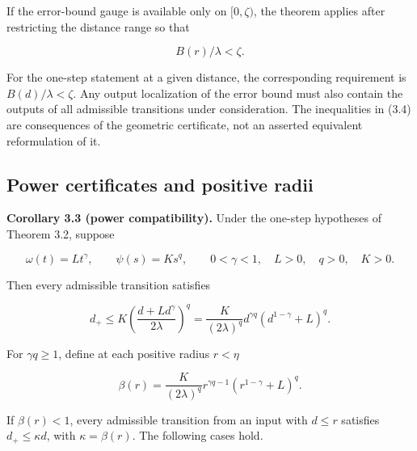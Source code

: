 \documentclass[11pt,a4paper]{article}
\theoremstyle{plain}
\theoremstyle{definition}
\theoremstyle{remark}
\begin{document}
If the error-bound gauge is available only on \([0,\zeta)\), the theorem
applies after restricting the distance range so that

\[
B(r)/\lambda<\zeta.
\tag{3.14}
\]

For the one-step statement at a given distance, the corresponding
requirement is \(B(d)/\lambda<\zeta\). Any output localization of the
error bound must also contain the outputs of all admissible transitions
under consideration. The inequalities in (3.4) are consequences of the
geometric certificate, not an asserted equivalent reformulation of it.

\hypertarget{power-certificates-and-positive-radii}{%
\subsection{Power certificates and positive
radii}\label{power-certificates-and-positive-radii}}

\textbf{Corollary 3.3 (power compatibility).} Under the one-step
hypotheses of Theorem 3.2, suppose

\[
\omega(t)=Lt^\gamma,
\qquad
\psi(s)=Ks^q,
\qquad
0<\gamma<1,\quad L>0,\quad q>0,\quad K>0.
\tag{3.15}
\]

Then every admissible transition satisfies

\[
d_+
\le K\left(\frac{d+Ld^\gamma}{2\lambda}\right)^q
=\frac{K}{(2\lambda)^q}
d^{\gamma q}(d^{1-\gamma}+L)^q.
\tag{3.16}
\]

For \(\gamma q\ge1\), define at each positive radius \(r<\eta\)

\[
\beta(r)=\frac{K}{(2\lambda)^q}
r^{\gamma q-1}(r^{1-\gamma}+L)^q.
\tag{3.17}
\]

If \(\beta(r)<1\), every admissible transition from an input with
\(d\le r\) satisfies \(d_+\le\kappa d\), with \(\kappa=\beta(r)\). The
following cases hold.
\end{document}
